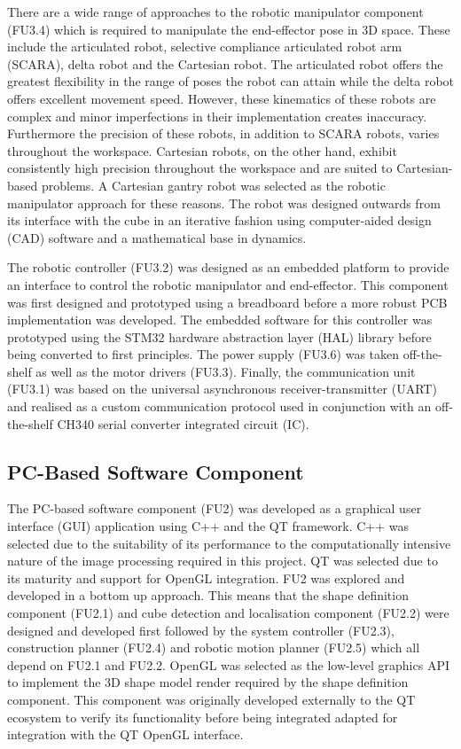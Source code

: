  There are a wide range of approaches to the robotic manipulator component (FU3.4) which is required to manipulate the end-effector pose in 3D space. These include the articulated robot, selective compliance articulated robot arm (SCARA), delta robot and the Cartesian robot. The articulated robot offers the greatest flexibility in the range of poses the robot can attain while the delta robot offers excellent movement speed. However, these kinematics of these robots are complex and minor imperfections in their implementation creates inaccuracy. Furthermore the precision of these robots, in addition to SCARA robots, varies throughout the workspace. Cartesian robots, on the other hand, exhibit consistently high precision throughout the workspace and are suited to Cartesian-based problems. A Cartesian gantry robot was selected as the robotic manipulator approach for these reasons. The robot was designed outwards from its interface with the cube in an iterative fashion  using computer-aided design (CAD) software and a mathematical base in dynamics.
 
 The robotic controller (FU3.2) was designed as an embedded platform to provide an interface to control the robotic manipulator and end-effector. This component was first designed and prototyped using a breadboard before a more robust PCB implementation was developed. The embedded software for this controller was prototyped using the STM32 hardware abstraction layer (HAL) library before being converted to first principles. The power supply (FU3.6) was taken off-the-shelf as well as the motor drivers (FU3.3). Finally, the communication unit (FU3.1) was based on the universal asynchronous receiver-transmitter (UART) and realised as a custom communication protocol used in conjunction with an off-the-shelf CH340 serial converter integrated circuit (IC).

\subsection{PC-Based Software Component}

The PC-based software component (FU2) was developed as a graphical user interface (GUI) application using C++ and the QT framework. C++ was selected due to the suitability of its performance to the computationally intensive nature of the image processing required in this project. QT was selected due to its maturity and support for OpenGL integration. FU2 was explored and developed in a bottom up approach. This means that the shape definition component (FU2.1) and cube detection and localisation component (FU2.2) were designed and developed first followed by the system controller (FU2.3), construction planner (FU2.4) and robotic motion planner (FU2.5) which all depend on FU2.1 and FU2.2. OpenGL was selected as the low-level graphics API to implement the 3D shape model render required by the shape definition component. This component was originally developed externally to the QT ecosystem to verify its functionality before being integrated adapted for integration with the QT OpenGL interface.

